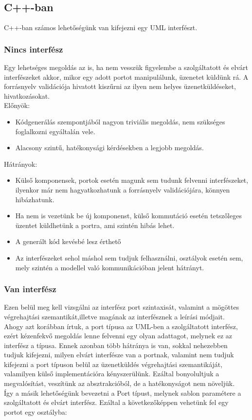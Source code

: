 \documentclass[a4paper,12pt]{report}
\begin{document}
\subsection{C++-ban}
C++-ban számos lehetőségünk van kifejezni egy UML interfészt.
\subsubsection{Nincs interfész}
Egy lehetséges megoldás az is, ha nem vesszük figyelembe a szolgáltatott és elvárt interfészeket akkor, mikor egy adott portot manipulálunk, üzenetet küldünk rá. A forrásnyelv validációja hivatott kiszűrni az ilyen nem helyes üzenetküldéseket, hivatkozásokat. \\
Előnyök:
\begin{itemize}
\item Kódgenerálás szempontjából nagyon triviális megoldás, nem szükséges foglalkozni egyáltalán vele.
\item Alacsony szintű, hatékonysági kérdésekben a legjobb megoldás. 
\end{itemize}
Hátrányok:
\begin{itemize}
\item Külső komponensek, portok esetén magunk sem tudunk felvenni interfészeket, ilyenkor már nem hagyatkozhatunk a forrásnyelv validációjára, könnyen hibázhatunk.
\item Ha nem is vezetünk be új komponenst, külső kommutáció esetén tetszőleges üzentet küldhetünk a portra, ami szintén hibás lehet.
\item A generált kód kevésbé lesz érthető
\item Az interfészeket sehol máshol sem tudjuk felhasználni, osztályok esetén sem, mely szintén a modellel való kommunikációban jelent hátrányt. 
\end{itemize}

\subsubsection{Van interfész}
Ezen belül meg kell vizsgálni az interfész port szintaxisát, valamint a mögöttes végrehajtási szemantikát,illetve magának az interfésznek a leírási módjait. \\
Ahogy azt korábban írtuk, a port típusa az UML-ben a szolgáltatott interfész, ezért kézenfekvő megoldás lenne felvenni egy olyan adattagot, melynek ez az interfész a típusa. Ennek azonban több hátránya is van, sokkal nehezebben tudjuk kifejezni, milyen elvárt interfésze van a portnak, valamint nem tudjuk kifejezni a port típuson belül az üzenetküldés végrehajtási szemantikáját, valamilyen külső implementációra kényszerülünk. Ezáltal bonyolultjuk a megvalósítást, veszítünk az absztrakcióból, de a hatékonyságot nem növeljük. \\
Így a másik lehetőségünk bevezetni a Port típust, melynek sablon paramétere a szolgáltatott és elvárt interfész. Ezáltal a következőképpen vehetünk fel egy portot egy osztályba: \\
\end{document}
